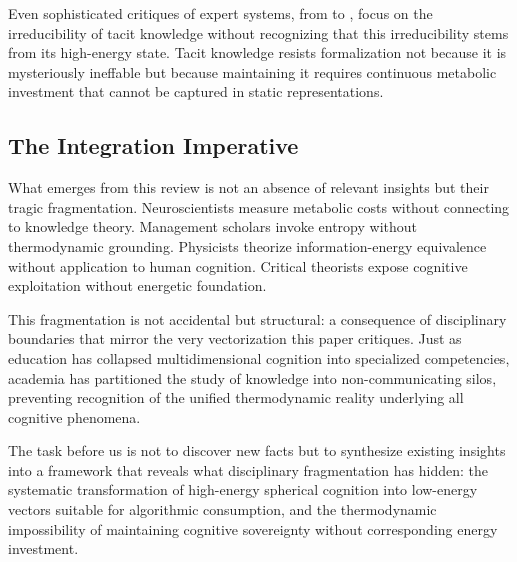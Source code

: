 Even sophisticated critiques of expert systems, from \citet{dreyfus1979} to \citet{collins2010}, focus on the irreducibility of tacit knowledge without recognizing that this irreducibility stems from its high-energy state. Tacit knowledge resists formalization not because it is mysteriously ineffable but because maintaining it requires continuous metabolic investment that cannot be captured in static representations.

\subsection{The Integration Imperative}

What emerges from this review is not an absence of relevant insights but their tragic fragmentation. Neuroscientists measure metabolic costs without connecting to knowledge theory. Management scholars invoke entropy without thermodynamic grounding. Physicists theorize information-energy equivalence without application to human cognition. Critical theorists expose cognitive exploitation without energetic foundation.

This fragmentation is not accidental but structural: a consequence of disciplinary boundaries that mirror the very vectorization this paper critiques. Just as education has collapsed multidimensional cognition into specialized competencies, academia has partitioned the study of knowledge into non-communicating silos, preventing recognition of the unified thermodynamic reality underlying all cognitive phenomena.

The task before us is not to discover new facts but to synthesize existing insights into a framework that reveals what disciplinary fragmentation has hidden: the systematic transformation of high-energy spherical cognition into low-energy vectors suitable for algorithmic consumption, and the thermodynamic impossibility of maintaining cognitive sovereignty without corresponding energy investment.